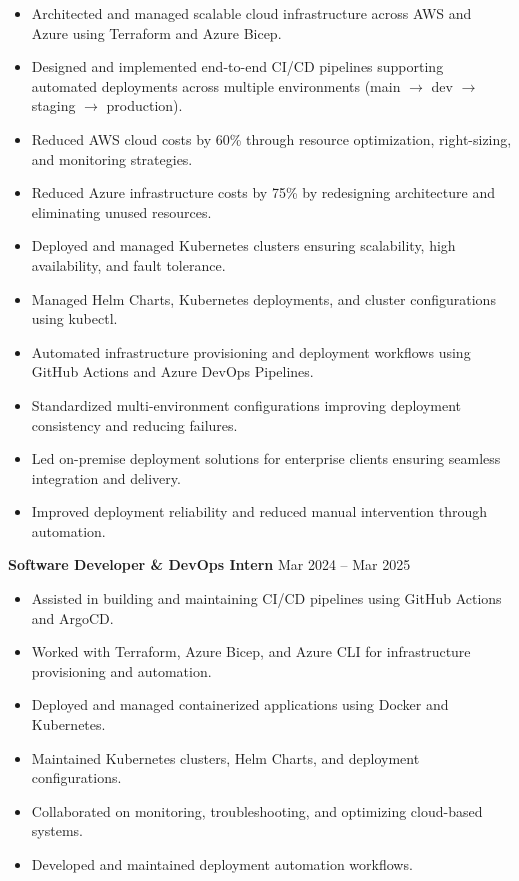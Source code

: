 \documentclass[a4paper,10pt]{article}
\begin{document}
\begin{itemize}[leftmargin=*]
    \item Architected and managed scalable cloud infrastructure across AWS and Azure using Terraform and Azure Bicep.
    \item Designed and implemented end-to-end CI/CD pipelines supporting automated deployments across multiple environments (main $\rightarrow$ dev $\rightarrow$ staging $\rightarrow$ production).
    \item Reduced AWS cloud costs by 60\% through resource optimization, right-sizing, and monitoring strategies.
    \item Reduced Azure infrastructure costs by 75\% by redesigning architecture and eliminating unused resources.
    \item Deployed and managed Kubernetes clusters ensuring scalability, high availability, and fault tolerance.
    \item Managed Helm Charts, Kubernetes deployments, and cluster configurations using kubectl.
    \item Automated infrastructure provisioning and deployment workflows using GitHub Actions and Azure DevOps Pipelines.
    \item Standardized multi-environment configurations improving deployment consistency and reducing failures.
    \item Led on-premise deployment solutions for enterprise clients ensuring seamless integration and delivery.
    \item Improved deployment reliability and reduced manual intervention through automation.
\end{itemize}

\textbf{Software Developer \& DevOps Intern} \hfill Mar 2024 -- Mar 2025

\begin{itemize}[leftmargin=*]
    \item Assisted in building and maintaining CI/CD pipelines using GitHub Actions and ArgoCD.
    \item Worked with Terraform, Azure Bicep, and Azure CLI for infrastructure provisioning and automation.
    \item Deployed and managed containerized applications using Docker and Kubernetes.
    \item Maintained Kubernetes clusters, Helm Charts, and deployment configurations.
    \item Collaborated on monitoring, troubleshooting, and optimizing cloud-based systems.
    \item Developed and maintained deployment automation workflows.
\end{itemize}
\end{document}
